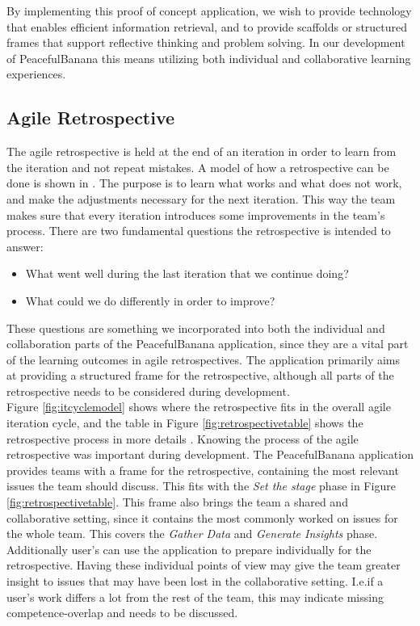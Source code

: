 By implementing this proof of concept application, we wish to provide technology that enables efficient information retrieval, and to provide scaffolds or structured frames that support reflective thinking and problem solving. In our development of PeacefulBanana this means utilizing both individual and collaborative learning experiences. 

\subsection{Agile Retrospective}
The agile retrospective is held at the end of an iteration in order to learn from the iteration and not repeat mistakes. A model of how a retrospective can be done is shown in \citep{Derby2006}. The purpose is to learn what works and what does not work, and make the adjustments necessary for the next iteration. This way the team makes sure that every iteration introduces some improvements in the team's process. There are two fundamental questions the retrospective is intended to answer:
\begin{itemize}
\item What went well during the last iteration that we continue doing?
\item What could we do differently in order to improve?
\end{itemize}
These questions are something we incorporated into both the individual and collaboration parts of the PeacefulBanana application, since they are a vital part of the learning outcomes in agile retrospectives. The application primarily aims at providing a structured frame for the retrospective, although all parts of the retrospective needs to be considered during development. \\
Figure \ref{fig:itcyclemodel} shows where the retrospective fits in the overall agile iteration cycle, and the table in Figure \ref{fig:retrospectivetable} shows the retrospective process in more details \citep{Derby2006}.
Knowing the process of the agile retrospective was important during development. The PeacefulBanana application provides teams with a frame for the retrospective, containing the most relevant issues the team should discuss. This fits with the \emph{Set the stage} phase in Figure \ref{fig:retrospectivetable}. This frame also brings the team a shared and collaborative setting, since it contains the most commonly worked on issues for the whole team. This covers the \emph{Gather Data} and \emph{Generate Insights} phase. Additionally user's can use the application to prepare individually for the retrospective. Having these individual points of view may give the team greater insight to issues that may have been lost in the collaborative setting. I.e.if a user's work differs a lot from the rest of the team, this may indicate missing competence-overlap and needs to be discussed. \\

